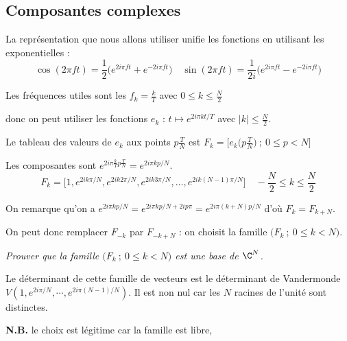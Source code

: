 \subsection{Composantes complexes}
La représentation que nous allons utiliser unifie les fonctions en utilisant les exponentielles :
\[\cos(2\pi ft)=\frac 12\bigl(e^{2i \pi f t} +e^{-2i\pi f t}\bigr) \quad \sin(2\pi f t)=\frac 1{2i}\bigl(e^{2i\pi f t} -e^{-2i\pi f t}\bigr)\]

Les fréquences utiles sont les $f_k = \frac kT$ avec $0\le k \le \frac N2$ 

donc on peut utiliser les fonctions $e_k$ : $t \mapsto e^{2i\pi k t/T}$ avec $|k|\le \frac N2$.

Le tableau des valeurs de $e_k$ aux points $p\frac TN$ est $F_k = \bigl[e_k\bigl(p\frac TN\bigr)\ ;\ 0 \le p < N\bigr]$

Les composantes sont $e^{2i\pi\frac kTp\frac TN} = e^{2i\pi k p/N}$.
\[F_k = \bigl[1,e^{2ik\pi/N},e^{2ik2\pi/N},e^{2ik3\pi/N},\ldots,e^{2ik(N-1)\pi/N}\bigr]
\quad -\frac N2 \le k \le \frac N2\]

On remarque qu'on a $e^{2i\pi k p/N}=e^{2i\pi k p/N+2ip\pi}=e^{2i\pi (k+N)p/N}$ d'où $F_k=F_{k+N}$.

On peut donc remplacer $F_{-k}$ par $F_{-k+N}$ : on choisit la famille $\bigl(F_k\ ;\ 0\le k < N\bigr)$.
\begin{Exercise}\it 
Prouver que la famille $\bigl(F_k\ ;\ 0\le k < N\bigr)$ est une base de $\C^N$.
\end{Exercise}
\begin{Answer} 
Le déterminant de cette famille de vecteurs est le déterminant de Vandermonde
$V(1, e^{2i\pi /N}, \cdots, e^{2i\pi (N-1)/N})$. Il est non nul car les $N$ racines de l'unité sont distinctes.
\end{Answer}

{\bf N.B.} le choix est légitime car la famille est libre, 
